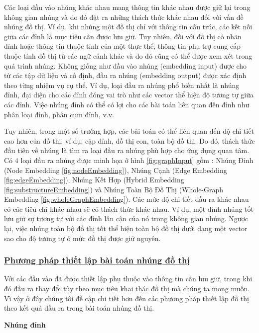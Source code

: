 Các loại đầu vào nhúng khác nhau mang thông tin khác nhau được giữ lại trong không gian nhúng và do đó đặt ra những thách thức khác nhau đối với vấn đề nhúng đồ thị. 
Ví dụ, khi nhúng một đồ thị chỉ với thông tin cấu trúc, các kết nối giữa các đỉnh là mục tiêu cần được lưu giữ. Tuy nhiên, đối với đồ thị có nhãn đỉnh hoặc thông tin thuộc tính của một thực thể, thông tin phụ trợ cung cấp thuộc tính đồ thị từ các ngữ cảnh khác và do đó cũng có thể được xem xét trong quá trình nhúng. Không giống như đầu vào nhúng (embedding input) được cho từ các tập dữ liệu và cố định, đầu ra nhúng (embedding output) được xác định theo từng nhiệm vụ cụ thể.
Ví dụ, loại đầu ra nhúng phổ biến nhất là nhúng đỉnh, đại diện cho các đỉnh đóng vai trò như các vector thể hiện độ tương tự giữa các đỉnh. Việc nhúng đỉnh có thể có lợi cho các bài toán liên quan đến đỉnh như phân loại đỉnh, phân cụm đỉnh, v.v.

Tuy nhiên, trong một số trường hợp, các bài toán có thể liên quan đến độ chi tiết cao hơn của đồ thị, ví dụ: cặp đỉnh, đồ thị con, toàn bộ đồ thị. Do đó, thách thức đầu tiên về nhúng là tìm ra loại đầu ra nhúng phù hợp cho ứng dụng quan tâm. Có 4 loại đầu ra nhúng được minh họa ở hình \ref{fig:graphInput} gồm : Nhúng Đỉnh (Node Embedding \ref{fig:nodeEmbedding}), Nhúng Cạnh (Edge Embedding \ref{fig:edgeEmbedding}), Nhúng Kết Hợp (Hybrid Embedding \ref{fig:substructureEmbedding}) và Nhúng Toàn Bộ Đồ Thị (Whole-Graph Embedding \ref{fig:wholeGraphEmbedding}). Các mức độ chi tiết đầu ra khác nhau có các tiêu chí khác nhau sẽ có thách thức khác nhau. Ví dụ, một đỉnh nhúng tốt lưu giữ sự tương tự với các đỉnh lân cận của nó trong không gian nhúng. Ngược lại, việc nhúng toàn bộ đồ thị tốt thể hiện toàn bộ đồ thị dưới dạng một vector sao cho độ tương tự ở mức đồ thị được giữ nguyên.

\subsubsection{\underline{Phương pháp thiết lập bài toán nhúng đồ thị}}

Với các đầu vào đã được thiết lập phụ thuộc vào thông tin cần lưu giữ, trong khi đó đầu ra thay đổi tùy theo mục tiêu khai thác đồ thị mà chúng ta mong muốn. Vì vậy ở đây chúng tôi đề cập chi tiết hơn đến các phương pháp thiết lập đồ thị theo kết quả đầu ra trong bài toán nhúng đồ thị.

\textbf{Nhúng đỉnh}
\label{sec:nodeEmbedding}

